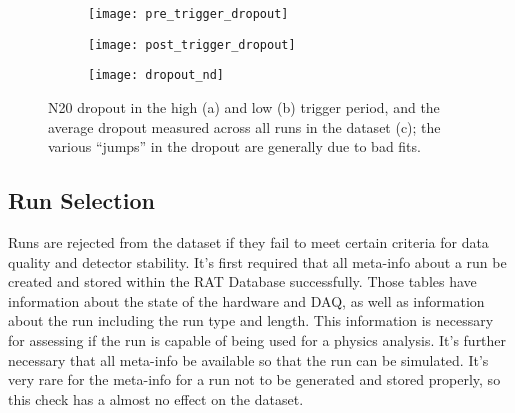 \begin{figure}[htbp]
    \centering
    \begin{subfigure}[b]{0.48\textwidth}
        \centering
        \texttt{[image: pre\_trigger\_dropout]}
        \caption[]{}
    \end{subfigure}
    \hfill
    \begin{subfigure}[b]{0.48\textwidth}
        \centering
        \texttt{[image: post\_trigger\_dropout]}
        \caption[]{}
    \end{subfigure}

    \begin{subfigure}[b]{0.78\textwidth}
        \centering
        \texttt{[image: dropout\_nd]}
        \caption[]{}
    \end{subfigure}
    \caption[Dropout In Low and High Trigger Period]{
        N20 dropout in the high (a) and low (b) trigger period,
        and the average dropout measured across all runs in the
        dataset (c); the various ``jumps'' in the dropout are generally
        due to bad fits.}
    \label{fig:dataset_dropout}
\end{figure}
%

\subsection{Run Selection}
\label{sec:run_selection}
Runs are rejected from the dataset if they fail to meet certain criteria
for data quality and detector stability.
It's first required that all meta-info about a run be created and stored
within the RAT Database successfully.
Those tables have information about the state of the hardware and DAQ, as
well as information about the run including the run type and length.
This information is necessary for assessing if the run is capable of being
used for a physics analysis.
It's further necessary that all meta-info be available so that the run
can be simulated.
It's very rare for the meta-info for a run not to be generated and stored
properly, so this check has a almost no effect on the dataset.

